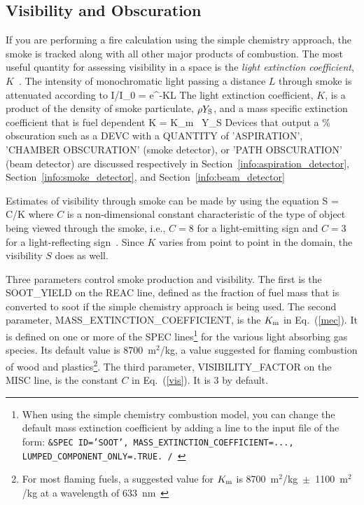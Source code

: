 \documentclass[11pt]{book}
\begin{document}
\subsection{Visibility and Obscuration}
\label{info:visibility}
\label{info:obscuration}

If you are performing a fire calculation using the simple chemistry
approach, the smoke is tracked along with all other major products of
combustion. The most useful quantity for assessing visibility in a
space is the {\em light extinction coefficient},
$K$~\cite{SFPE:Mulholland}. The intensity of monochromatic light
passing a distance $L$ through smoke is attenuated according to
\be I/I_0 = {\rm e}^{-KL} \ee
The light extinction coefficient, $K$, is a product of the
density of smoke particulate, $\rho Y_{\rm S}$, and a mass specific
extinction coefficient that is fuel dependent
\be K = K_{\rm m} \; \rho \, Y_{\rm S} \label{mec} \ee
Devices that output a \% obscuration such as a {\ct DEVC} with a {\ct QUANTITY} of {\ct 'ASPIRATION'}, {\ct 'CHAMBER OBSCURATION'} (smoke
detector), or {\ct 'PATH OBSCURATION'} (beam detector) are discussed
respectively in Section~\ref{info:aspiration_detector},
Section~\ref{info:smoke_detector}, and Section~\ref{info:beam_detector}

Estimates of visibility through smoke can be made by using the
equation
\be  S = C/K  \label{vis}  \ee
where $C$ is a non-dimensional constant characteristic of
the type of object being viewed through the smoke, i.e.,
$C=8$ for a light-emitting sign and $C=3$ for a light-reflecting
sign~\cite{SFPE:Mulholland}. Since $K$ varies from point to point in the
domain, the visibility $S$ does as well.

Three parameters control smoke production and visibility.
The first is the {\ct SOOT\_YIELD} on the {\ct REAC} line, defined as the fraction of fuel mass that
is converted to soot if the simple chemistry approach is being used. The second parameter,
{\ct MASS\_EXTINCTION\_COEFFICIENT}, is the $K_{\rm m}$ in Eq.~(\ref{mec}). It is defined on one or more of the {\ct SPEC} lines\footnote{When using the simple chemistry combustion model, you can change the default mass extinction coefficient by adding a line to the input file of the form: \tt{\footnotesize \&SPEC ID='SOOT', MASS\_EXTINCTION\_COEFFICIENT=..., LUMPED\_COMPONENT\_ONLY=.TRUE. /} } for the various light absorbing gas species. Its default value is 8700~m$^2$/kg, a value
suggested for flaming combustion of wood and plastics\footnote{For most flaming fuels, a suggested value for $K_{\rm m}$ is 8700~m$^2$/kg~$\pm$~1100~m$^2$/kg at a wavelength of 633~nm~\cite{Mulholland:F+M}}. The third parameter, {\ct VISIBILITY\_FACTOR} on the {\ct MISC} line, is the
constant $C$ in Eq.~(\ref{vis}). It is 3 by default.
\end{document}
